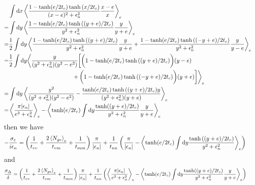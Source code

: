 \documentclass[aps,prl,preprint]{revtex4-2}
\begin{document}
\begin{align}
      & \int\dd x\ev{\frac{1-\tanh(e/2t_c)\tanh{(x/2t_c)}}{(x-e)^2 + \epsilon_n^2}\frac{x-e}{x}}_e \\
    = & \int\dd y\ev{\frac{1-\tanh(e/2t_c)\tanh{((y+e)/2t_c)}}{y^2 + \epsilon_n^2}\frac{y}{y+e}}_e \\
    = & \frac{1}{2}\int\dd y\ev{\frac{1-\tanh(e/2t_c)\tanh{((y+e)/2t_c)}}{y^2 + \epsilon_n^2}\frac{y}{y+e}
    + \frac{1-\tanh(e/2t_c)\tanh{((-y+e)/2t_c)}}{y^2 + \epsilon_n^2}\frac{y}{y-e}}_e \nonumber \\
    = & \frac{1}{2}\int\dd y\bigg<\frac{y}{(y^2+\epsilon^2_n)(y^2-e^2)}\bigg[\bigg(1-\tanh(e/2t_c)\tanh{((y+e)/2t_c)}\bigg)(y-e)\nonumber\\
    &\quad\quad\quad\quad\quad\quad\quad\quad\quad\quad\quad+\bigg(1-\tanh(e/2t_c)\tanh{((-y+e)/2t_c)}\bigg)(y+e)\bigg]\bigg>_e \\
    = & \int\dd y\ev{\frac{y^2}{(y^2+\epsilon^2_n)(y^2-e^2)}-\frac{\tanh(e/2t_c)\tanh{((y+e)/2t_c)}y}{(y^2+\epsilon^2_n)(y+e)}}_e \\
    = & \ev{\frac{\pi|\epsilon_n|}{e^2+\epsilon_n^2}}_e - \ev{\tanh(e/2t_c)\int\dd y\frac{\tanh((y+e)/2t_c)}{y^2+\epsilon^2_n}\frac{y}{y+e}}_e
\end{align}
then we have
\begin{align}
    -\frac{\sigma_\varepsilon}{i\epsilon_n} & = \left(\frac{1}{t_{vv}} + \frac{2\ev{N_{ge}}_e}{t_{vm}} + \frac{1}{t_{mm}}\right)\frac{\pi}{|\epsilon_n|}
     + \frac{1}{t_{nn}}\left(\frac{\pi}{|\epsilon_n|}-\ev{\tanh(e/2t_c)\int\dd y\frac{\tanh{((y+e)/2t_c)}}{y^2+\epsilon^2_n}}_e\right) \nonumber
\end{align}
and
\begin{align}
    \frac{\sigma_\Delta}{\delta} & = \left(\frac{1}{t_{vv}} + \frac{2\ev{N_{ge}}_e}{t_{vm}} + \frac{1}{t_{mm}}\right)\frac{\pi}{|\epsilon_n|}
     + \frac{1}{t_{nn}}\left(\ev{\frac{\pi|\epsilon_n|}{e^2+\epsilon_n^2}}_e - \ev{\tanh(e/2t_c)\int\dd y\frac{\tanh((y+e)/2t_c)}{y^2+\epsilon^2_n}\frac{y}{y+e}}_e\right) \nonumber
\end{align}
\end{document}

